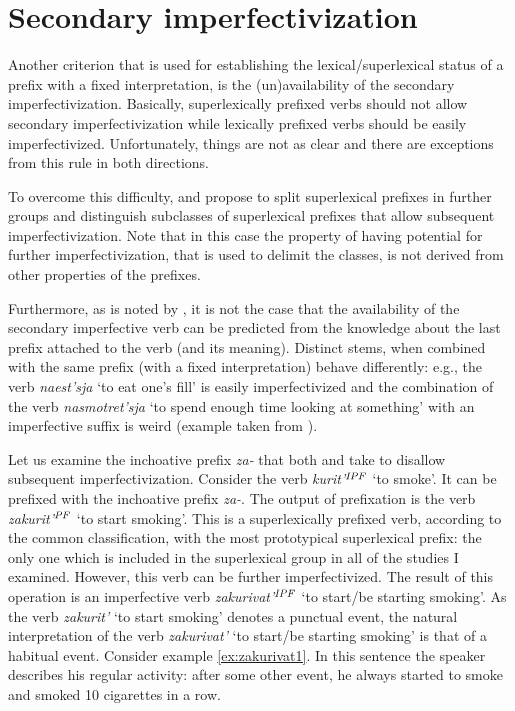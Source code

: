 \section{Secondary imperfectivization}\label{section:new:imperfectivization}
Another criterion that is used for establishing the lexical/superlexical status of a prefix with a fixed interpretation, is the (un)availability of the secondary imperfectivization. Basically, superlexically prefixed verbs should not allow secondary imperfectivization while lexically prefixed verbs should be easily imperfectivized. Unfortunately, things are not as clear and there are exceptions from this rule in both directions. 

To overcome this difficulty, \citet{Svenonius:04b} and \citet{Tatevosov:07, Tatevosov:09} propose to split superlexical prefixes in further groups and distinguish subclasses of superlexical prefixes that allow subsequent imperfectivization. Note that in this case the property of having potential for further imperfectivization, that is used to delimit the classes, is not derived from other properties of the prefixes.

Furthermore, as is noted by \citet[35]{Kagan:book}, it is not the case that the availability of the secondary imperfective verb can be predicted from the knowledge about the last prefix attached to the verb (and its meaning). Distinct stems, when combined with the same prefix (with a fixed interpretation) behave differently: e.g., the verb \textit{naest’sja} `to eat one's fill' is easily imperfectivized and the combination of the verb \textit{nasmotret'sja} `to spend enough time looking at something' with an imperfective suffix is weird (example taken from \citealt[35]{Kagan:book}).

Let us examine the inchoative prefix \textit{za-} that both \citet[230]{Svenonius:04b} and \citet[116]{Tatevosov:09} take to disallow subsequent imperfectivization. Consider the verb \textit{kurit'}$^{\mathit{IPF}}$ `to smoke'. It can be prefixed with the inchoative prefix {\textit{za-}.} The output of prefixation is the verb \textit{zakurit'}$^{\mathit{PF}}$ `to start smoking'. This is a superlexically prefixed verb, according to the common classification, with the most prototypical superlexical prefix: the only one which is included in the superlexical group in all of the studies I examined. However, this verb can be further imperfectivized. The result of this operation is an imperfective verb \textit{zakurivat'}$^{\mathit{IPF}}$ `to start/be starting smoking'. As the verb \textit{zakurit'} `to start smoking' denotes a punctual event, the natural interpretation of the verb \textit{zakurivat'} `to start/be starting smoking'  is that of a habitual event. Consider example \ref{ex:zakurivat1}. In this sentence the speaker describes his regular activity: after some other event, he always started to smoke and smoked 10 cigarettes in a row. 

